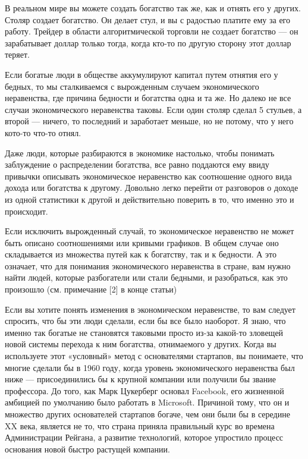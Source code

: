 \documentclass[ebook,12pt,oneside,openany]{memoir}
\begin{document}
В реальном мире вы можете создать богатство так же, как и отнять его у
других. Столяр создает богатство. Он делает стул, и вы с радостью
платите ему за его работу. Трейдер в области алгоритмической торговли
не создает богатство — он зарабатывает доллар только тогда, когда
кто-то по другую сторону этот доллар теряет.

Если богатые люди в обществе аккумулируют капитал путем отнятия его у
бедных, то мы сталкиваемся с вырожденным случаем экономического
неравенства, где причина бедности и богатства одна и та же. Но далеко
не все случаи экономического неравенства таковы. Если один столяр
сделал 5 стульев, а второй — ничего, то последний и заработает меньше,
но не потому, что у него кото-то что-то отнял.

Даже люди, которые разбираются в экономике настолько, чтобы понимать
заблуждение о распределении богатства, все равно поддаются ему ввиду
привычки описывать экономическое неравенство как соотношение одного
вида дохода или богатства к другому. Довольно легко перейти от
разговоров о доходе из одной статистики к другой и действительно
поверить в то, что именно это и происходит.

Если исключить вырожденный случай, то экономическое неравенство не
может быть описано соотношениями или кривыми графиков. В общем случае
оно складывается из множества путей как к богатству, так и к бедности.
А это означает, что для понимания экономического неравенства в стране,
вам нужно найти людей, которые разбогатели или стали бедными, и
разобраться, как это произошло (см. примечание [2] в конце статьи)

Если вы хотите понять изменения в экономическом неравенстве, то вам
следует спросить, что бы эти люди сделали, если бы все было наоборот.
Я знаю, что именно так богатые не становятся таковыми просто из-за
какой-то зловещей новой системы перехода к ним богатства, отнимаемого
у других. Когда вы используете этот «условный» метод с основателями
стартапов, вы понимаете, что многие сделали бы в 1960 году, когда
уровень экономического неравенства был ниже — присоединились бы к
крупной компании или получили бы звание профессора. До того, как Марк
Цукерберг основал Facebook, его жизненной амбицией по умолчанию было
работать в Microsoft. Причиной тому, что он и множество других
основателей стартапов богаче, чем они были бы в середине XX века,
является не то, что страна приняла правильный курс во времена
Администрации Рейгана, а развитие технологий, которое упростило
процесс основания новой быстро растущей компании.
\end{document}

